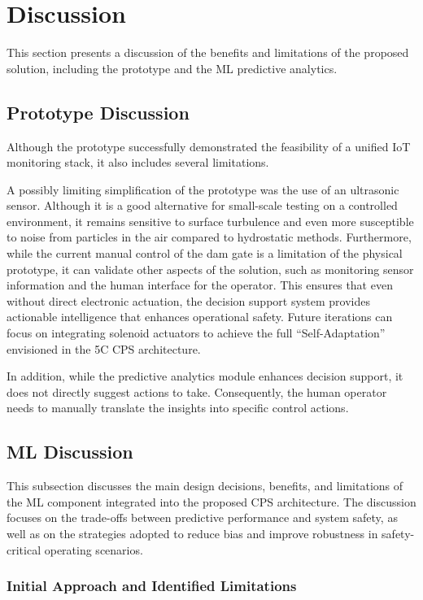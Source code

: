 \section{Discussion}\label{sec:discussion}
This section presents a discussion of the benefits and limitations of the proposed solution, including the prototype and the ML predictive analytics.

\subsection{Prototype Discussion}
Although the prototype successfully demonstrated the feasibility of a unified IoT monitoring stack, it also includes several limitations.

A possibly limiting simplification of the prototype was the use of an ultrasonic sensor. Although it is a good alternative for small-scale testing on a controlled environment, it remains sensitive to surface turbulence and even more susceptible to noise from particles in the air compared to hydrostatic methods. Furthermore, while the current manual control of the dam gate is a limitation of the physical prototype, it can validate other aspects of the solution, such as monitoring sensor information and the human interface for the operator. This ensures that even without direct electronic actuation, the decision support system provides actionable intelligence that enhances operational safety. Future iterations can focus on integrating solenoid actuators to achieve the full ``Self-Adaptation'' envisioned in the 5C CPS architecture.

In addition, while the predictive analytics module enhances decision support, it does not directly suggest actions to take. Consequently, the human operator needs to manually translate the insights into specific control actions.

\subsection{ML Discussion}

This subsection discusses the main design decisions, benefits, and limitations of the ML component integrated into the proposed CPS architecture. The discussion focuses on the trade-offs between predictive performance and system safety, as well as on the strategies adopted to reduce bias and improve robustness in safety-critical operating scenarios.

\subsubsection{Initial Approach and Identified Limitations}

